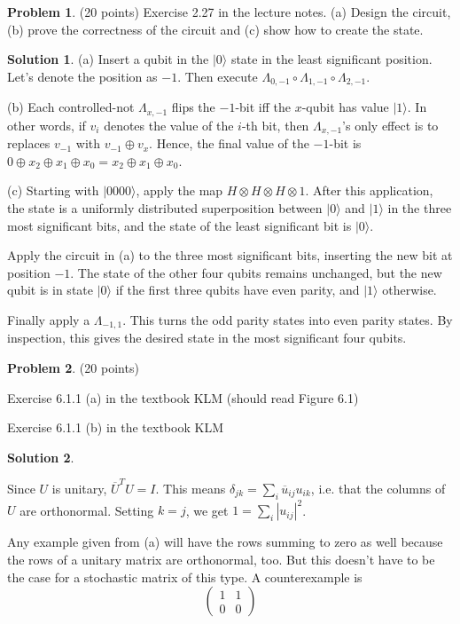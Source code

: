 \documentclass{article}
\theoremstyle{definition}
\newtheorem{problem}{Problem}
\newtheorem*{solution}{Solution}
\newcommand{\ket}[1]{|#1\rangle}
\begin{document}
\begin{problem}(20 points)
Exercise 2.27 in the lecture notes. (a) Design the circuit, 
(b) prove the correctness of the
circuit and (c) show how to create the state. 
\end{problem}
\begin{solution}
(a) Insert a qubit in the $\ket{0}$ state in the least significant position. Let's denote the position as
$-1$.  Then execute $\Lambda_{0,-1} \circ \Lambda_{1,-1} \circ \Lambda_{2,-1}$.

(b) Each controlled-not $\Lambda_{x,-1}$ flips the $-1$-bit iff the $x$-qubit has value $\ket{1}$.
In other words, if $v_i$ denotes the value of the $i$-th bit, then $\Lambda_{x,-1}$'s only effect
is to replaces $v_{-1}$ with $v_{-1} \oplus v_x$.
Hence, the final value of the $-1$-bit is
$0 \oplus x_2 \oplus x_1 \oplus x_0 = x_2 \oplus x_1 \oplus x_0$.

(c) Starting with $\ket{0000}$,  apply the map $H \otimes H \otimes H \otimes 1$.  
After this application, the state is a uniformly distributed superposition between $\ket{0}$ and
 $\ket{1}$ in the three most significant bits, and the state of the least
significant bit is $\ket{0}$.  

Apply the circuit in (a) to the three most significant bits, inserting the
new bit at position $-1$.  The state of the other four qubits remains unchanged, but the new
qubit is in state $\ket{0}$ if the first three qubits have even parity, and $\ket{1}$ otherwise.

Finally apply a $\Lambda_{-1, 1}$.  This turns the odd parity states into even parity states.  
By inspection, this gives the desired state in the most significant four qubits.
\end{solution}

\begin{problem}(20 points)
\begin{compactenum}[(a)]
\item Exercise 6.1.1 (a) in the textbook KLM (should read Figure 6.1)
\item Exercise 6.1.1 (b) in the textbook KLM
\end{compactenum}
\end{problem}
\begin{solution}
\begin{compactenum}[(a)]
\item Since $U$ is unitary, $\overline U^T U = I$.  This means $\delta_{jk} = \sum_i \overline u_{ij}  u_{ik}$, i.e. that the
columns of $U$ are orthonormal.  Setting $k = j$, we get $1 = \sum_i |u_{ij}|^2$.
\item Any example given from (a) will have the rows summing to zero as well because the rows of a unitary matrix are orthonormal, too.  But this
doesn't have to be the case for a stochastic matrix of this type.  A counterexample is
$$
\begin{pmatrix}
1 & 1 \\
0 & 0
\end{pmatrix}
$$
\end{compactenum}

\end{solution}
\end{document}
